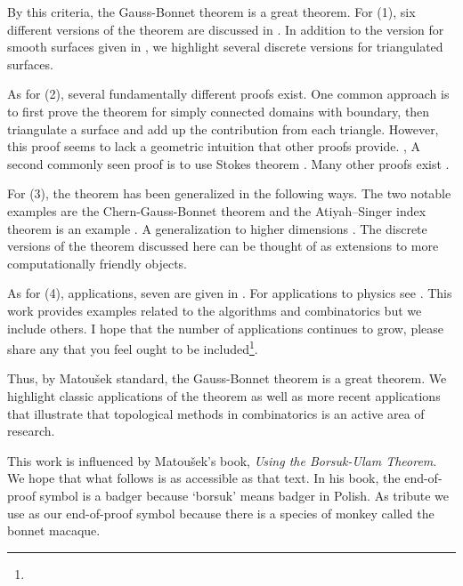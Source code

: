 By this criteria, the Gauss-Bonnet theorem is a great theorem.
For (1), six different versions of the theorem are discussed
in \cite{wu_historical_2008}. 
In addition to the version for smooth surfaces given in ,
we highlight several discrete versions for triangulated surfaces. 
 
 
 
As for (2), several fundamentally different proofs exist.  
One common approach is to first prove the theorem for simply connected domains
with boundary, then triangulate a surface and add up the contribution from each triangle.
However, this proof seems to lack a geometric intuition that other proofs provide. \cite{wu_historical_2008},
A second commonly seen proof is to use Stokes theorem  \cite{doc76,pressley_elementary_2010}.
Many other proofs exist \cite{guillemin_differential_2010,levi-bicycle,grinfeld_introduction_2013}.


For (3), the theorem has been generalized in the following ways.
The two notable examples are the Chern-Gauss-Bonnet theorem\cite{chern_simple_1944} and
the Atiyah–Singer index theorem is an example  \cite{atiyah_index_1963}.
A generalization to higher dimensions \cite{guillemin_differential_2010}.
The discrete versions of the theorem discussed here can be thought of as extensions
to more computationally friendly objects.



As for (4), applications, 
seven are given in \cite{doc76}.
For applications to physics see \cite{tirado-physics-apps,gibbons_applications_2008}.
This work provides examples related to the algorithms and combinatorics but we include
others.
I hope that the number of applications continues to grow,
please share any that you feel
ought to be included\footnote{}.

Thus, by Matou\v{s}ek standard, the Gauss-Bonnet theorem is a great theorem.
We highlight classic applications of the theorem as well as more recent
applications that illustrate that topological methods in combinatorics is an active
area of research.

This work is influenced by Matou\v{s}ek's book, \emph{Using the Borsuk-Ulam Theorem}.
We hope that what follows is as accessible as that text. In his book, the end-of-proof symbol is
a badger because `borsuk' means badger in Polish. As tribute we use \macaque as 
our end-of-proof symbol because there is a species of monkey called the bonnet macaque.



